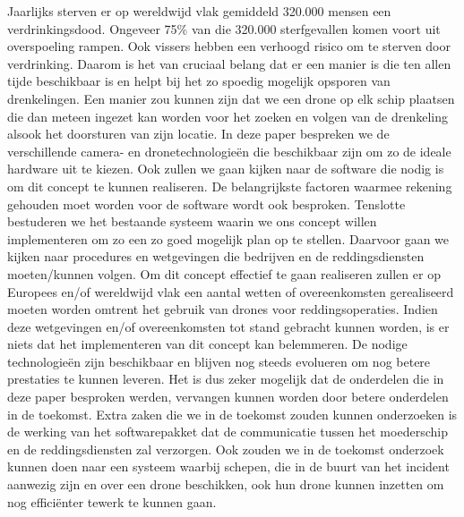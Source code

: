 Jaarlijks sterven er op wereldwijd vlak gemiddeld 320.000 mensen een verdrinkingsdood. Ongeveer 75\% van die 320.000 sterfgevallen komen voort uit overspoeling rampen. Ook vissers hebben een verhoogd risico om te sterven door verdrinking. Daarom is het van cruciaal belang dat er een manier is die ten allen tijde beschikbaar is en helpt bij het zo spoedig mogelijk opsporen van drenkelingen. Een manier zou kunnen zijn dat we een drone op elk schip plaatsen die dan meteen ingezet kan worden voor het zoeken en volgen van de drenkeling alsook het doorsturen van zijn locatie. In deze paper bespreken we de verschillende camera- en dronetechnologieën die beschikbaar zijn om zo de ideale hardware uit te kiezen. Ook zullen we gaan kijken naar de software die nodig is om dit concept te kunnen realiseren. De belangrijkste factoren waarmee rekening gehouden moet worden voor de software wordt ook besproken.
Tenslotte bestuderen we het bestaande systeem waarin we ons concept willen implementeren om zo een zo goed mogelijk plan op te stellen. Daarvoor gaan we kijken naar procedures en wetgevingen die bedrijven en de reddingsdiensten moeten/kunnen volgen. Om dit concept effectief te gaan realiseren zullen er op Europees en/of wereldwijd vlak een aantal wetten of overeenkomsten gerealiseerd moeten worden omtrent het gebruik van drones voor reddingsoperaties. Indien deze wetgevingen en/of overeenkomsten tot stand gebracht kunnen worden, is er niets dat het implementeren van dit concept kan belemmeren. De nodige technologieën zijn beschikbaar en blijven nog steeds evolueren om nog betere prestaties te kunnen leveren. Het is dus zeker mogelijk dat de onderdelen die in deze paper besproken werden, vervangen kunnen worden door betere onderdelen in de toekomst. Extra zaken die we in de toekomst zouden kunnen onderzoeken is de werking van het softwarepakket dat de communicatie tussen het moederschip en de reddingsdiensten zal verzorgen. Ook zouden we in de toekomst onderzoek kunnen doen naar een systeem waarbij schepen, die in de buurt van het incident aanwezig zijn en over een drone beschikken, ook hun drone kunnen inzetten om nog efficiënter tewerk te kunnen gaan.

